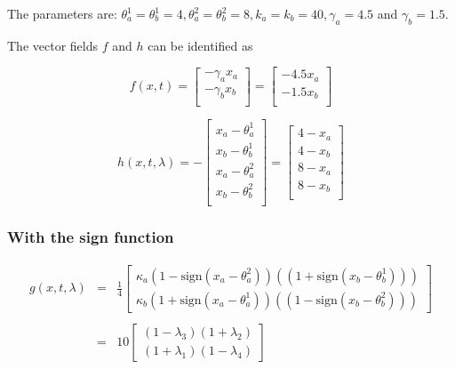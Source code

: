 \documentclass{article}
\begin{document}
The parameters are: $\theta_a^1=\theta_b^1=4, \theta_a^2=\theta_b^2=8, k_a=k_b=40, \gamma_a=4.5$ and $\gamma_b=1.5$.

The vector fields $f$ and $h$ can be identified as


\begin{equation}
  \label{eq:f1}
  f(x,t) = \left[
    \begin{array}{l}
      - \gamma_a x_a \\
      - \gamma_b x_b \\
    \end{array}
  \right]=\left[
    \begin{array}{l}
      - 4.5 x_a \\
      - 1.5 x_b \\
    \end{array}
  \right]
\end{equation}

\begin{equation}
  \label{eq:h1}
  h(x,t,\lambda) = -  \left[
    \begin{array}{l}
       x_a - \theta_a^1 \\      
       x_b - \theta_b^1 \\
       x_a - \theta_a^2 \\      
       x_b - \theta_b^2 \\
    \end{array}
  \right]=\left[
    \begin{array}{l}
      4- x_a \\      
      4- x_b \\
      8- x_a \\      
      8- x_b \\
    \end{array}
  \right]
\end{equation}


\subsubsection*{With the sign function}
\begin{equation}
  \label{eq:g1sign}
  \begin{array}{lcl}
  g(x,t,\lambda) &=&\displaystyle\frac 1 4  \left[
    \begin{array}{l}
      \kappa_a      (1- \mbox{sign}( x_a - \theta_a^2))((1+ \mbox{sign}( x_b - \theta_b^1)))\\
      \kappa_b      (1+ \mbox{sign}( x_a - \theta_a^1))((1- \mbox{sign}( x_b - \theta_b^2)))
    \end{array}
  \right]\\ \\
  &=& 10   \left[
    \begin{array}{l}
          (1-\lambda_3)(1+\lambda_2)\\
          (1+\lambda_1)(1-\lambda_4)
    \end{array}
  \right] 
\end{array}
\end{equation}
\end{document}
